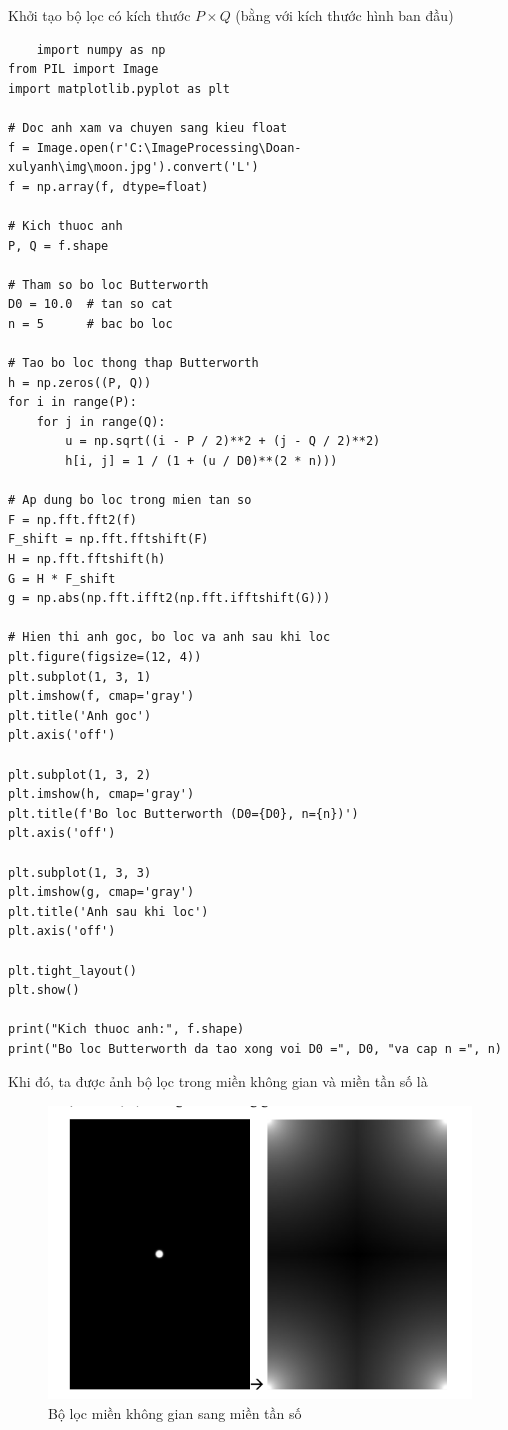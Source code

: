 \documentclass[12pt,a4paper]{report}
\numberwithin{equation}{section}
\theoremstyle{definition} %
\begin{document}
Khởi tạo bộ lọc có kích thước $P \times Q$ (bằng với kích thước hình ban đầu)

\begin{lstlisting}
	import numpy as np
from PIL import Image
import matplotlib.pyplot as plt

# Doc anh xam va chuyen sang kieu float
f = Image.open(r'C:\ImageProcessing\Doan-xulyanh\img\moon.jpg').convert('L')
f = np.array(f, dtype=float)

# Kich thuoc anh
P, Q = f.shape

# Tham so bo loc Butterworth
D0 = 10.0  # tan so cat
n = 5      # bac bo loc

# Tao bo loc thong thap Butterworth
h = np.zeros((P, Q))
for i in range(P):
    for j in range(Q):
        u = np.sqrt((i - P / 2)**2 + (j - Q / 2)**2)
        h[i, j] = 1 / (1 + (u / D0)**(2 * n)))

# Ap dung bo loc trong mien tan so
F = np.fft.fft2(f)
F_shift = np.fft.fftshift(F)
H = np.fft.fftshift(h)
G = H * F_shift
g = np.abs(np.fft.ifft2(np.fft.ifftshift(G)))

# Hien thi anh goc, bo loc va anh sau khi loc
plt.figure(figsize=(12, 4))
plt.subplot(1, 3, 1)
plt.imshow(f, cmap='gray')
plt.title('Anh goc')
plt.axis('off')

plt.subplot(1, 3, 2)
plt.imshow(h, cmap='gray')
plt.title(f'Bo loc Butterworth (D0={D0}, n={n})')
plt.axis('off')

plt.subplot(1, 3, 3)
plt.imshow(g, cmap='gray')
plt.title('Anh sau khi loc')
plt.axis('off')

plt.tight_layout()
plt.show()

print("Kich thuoc anh:", f.shape)
print("Bo loc Butterworth da tao xong voi D0 =", D0, "va cap n =", n)
\end{lstlisting}

Khi đó, ta được ảnh bộ lọc trong miền không gian và miền tần số là 
\begin{figure}[H]
\centering
\includegraphics[width=0.8\linewidth]{img/butterworthKG-TS.png}
\caption{Bộ lọc miền không gian sang miền tần số}
\end{figure}
\end{document}

